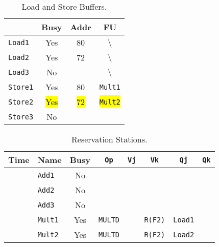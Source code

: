 \begin{enumerate}
    \begin{table}[!htp]
        \centering
        \begin{tabular}{@{} l | c c c @{}}
            \toprule
                                & Busy      & Addr      & FU   \\
            \midrule
            \texttt{Load1}      & Yes       & 80        & \textbackslash        \\ [.3em]
            \texttt{Load2}      & Yes       & 72        & \textbackslash        \\ [.3em]
            \texttt{Load3}      & No        &           & \textbackslash        \\
            \cmidrule{1-4}
            \texttt{Store1}     & Yes       & 80        & \texttt{Mult1}        \\ [.3em]
            \texttt{Store2}     & \hl{Yes}  & \hl{72}   & \hl{\texttt{Mult2}}   \\ [.3em]
            \texttt{Store3}     & No        &           &                       \\
            \bottomrule
        \end{tabular}
        \caption*{Load and Store Buffers.}
    \end{table}

    \begin{table}[!htp]
        \centering
        \begin{tabular}{@{} l l | c c c c c c @{}}
            \toprule
            Time        & Name              & Busy      & \texttt{Op}           & \texttt{Vj}       & \texttt{Vk}           & \texttt{Qj}           & \texttt{Qk}       \\
            \midrule
                        & \texttt{Add1}     & No        &                       &                   &                       &                       &                   \\ [.3em]
                        & \texttt{Add2}     & No        &                       &                   &                       &                       &                   \\ [.3em]
                        & \texttt{Add3}     & No        &                       &                   &                       &                       &                   \\ [.3em]
                        & \texttt{Mult1}    & Yes       & \texttt{MULTD}        &                   & \texttt{R(F2)}        & \texttt{Load1}        &                   \\ [.3em]
                        & \texttt{Mult2}    & Yes       & \texttt{MULTD}        &                   & \texttt{R(F2)}        & \texttt{Load2}        &                   \\
            \bottomrule
        \end{tabular}
        \caption*{Reservation Stations.}
    \end{table}


\end{enumerate}
